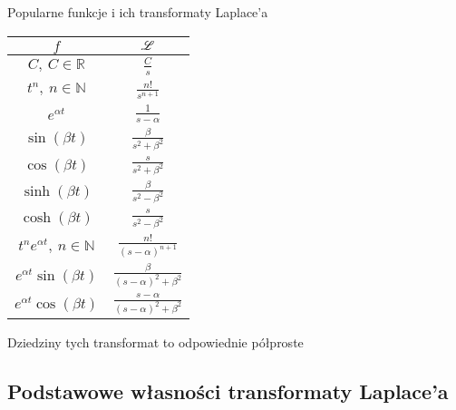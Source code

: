 \pagebreak

Popularne funkcje i ich transformaty Laplace'a

\begin{table}[!htbp]
    \centering
    \begin{tabularx}{\linewidth}{|C|C|}
        \hline
        $f$ & $\mathscr{L}$ \\[15pt] \hline
        $ C, \ C \in \mathbb{R} $ & $ \frac{C}{s} $ \\[15pt] \hline
        $ t^n, \ n \in \mathbb{N} $ & $ \frac{n!}{s^{n+1}} $ \\[15pt] \hline
        $ e^{\alpha t} $ & $ \frac{1}{s - \alpha} $ \\[15pt] \hline
        $ \sin(\beta t) $ & $ \frac{\beta}{s^2 + \beta^2} $ \\[15pt] \hline
        $ \cos(\beta t) $ & $ \frac{s}{s^2 + \beta^2} $ \\[15pt] \hline
        $ \sinh(\beta t) $ & $ \frac{\beta}{s^2 - \beta^2} $ \\[15pt] \hline
        $ \cosh(\beta t) $ & $ \frac{s}{s^2 - \beta^2} $ \\[15pt] \hline
        $ t^n e^{\alpha t}, \ n \in \mathbb{N} $ & $ \frac{n!}{(s-\alpha)^{n+1}} $ \\[15pt] \hline
        $ e^{\alpha t} \sin(\beta t) $ & $ \frac{\beta}{(s - \alpha)^2 + \beta^2} $ \\[15pt] \hline
        $ e^{\alpha t} \cos(\beta t) $ & $ \frac{s - \alpha}{(s - \alpha)^2 + \beta^2} $ \\[15pt] \hline
    \end{tabularx}
\end{table} \medskip

Dziedziny tych transformat to odpowiednie półproste

\pagebreak

\subsection{Podstawowe własności transformaty Laplace'a}

